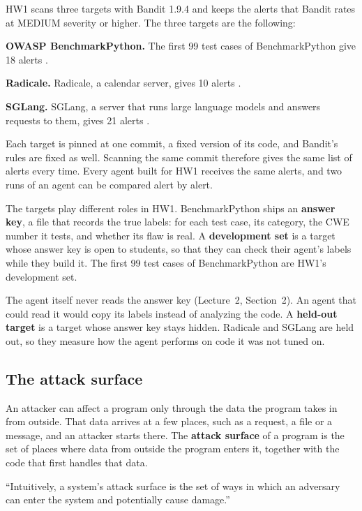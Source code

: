HW1 scans three targets with Bandit 1.9.4 and keeps the alerts that Bandit rates at MEDIUM severity
or higher. The three targets are the following:
\bi
\item \textbf{OWASP BenchmarkPython.} The first 99 test cases of BenchmarkPython give 18 alerts
\citep{owasp-benchmarkpython}.
\item \textbf{Radicale.} Radicale, a calendar server, gives 10 alerts \citep{radicale}.
\item \textbf{SGLang.} SGLang, a server that runs large language models and answers requests to
them, gives 21 alerts \citep{sglang}.
\ei

Each target is pinned at one commit, a fixed version of its code, and Bandit's rules are fixed as
well. Scanning the same commit therefore gives the same list of alerts every time. Every agent built
for HW1 receives the same alerts, and two runs of an agent can be compared alert by alert.

The targets play different roles in HW1. BenchmarkPython ships an \textbf{answer key}, a file that
records the true labels: for each test case, its category, the CWE number it tests, and whether its
flaw is real. A \textbf{development set} is a target whose answer key is open to students, so that
they can check their agent's labels while they build it. The first 99 test cases of BenchmarkPython
are HW1's development set.

The agent itself never reads the answer key (Lecture~2, Section~2). An agent that could read it would
copy its labels instead of analyzing the code. A \textbf{held-out target} is a target whose answer
key stays hidden. Radicale and SGLang are held out, so they measure how the agent performs on code
it was not tuned on.

\subsection{The attack surface}
\label{sec:discovery-surface}

An attacker can affect a program only through the data the program takes in from outside. That data
arrives at a few places, such as a request, a file or a message, and an attacker starts there. The
\textbf{attack surface} of a program is the set of places where data from outside the program enters
it, together with the code that first handles that data.

\begin{definition}
\label{def:discovery-surface}
``Intuitively, a system's attack surface is the set of ways in which an adversary can enter the
system and potentially cause damage.'' \citep[\S1]{manadhata2007approach}
\end{definition}

